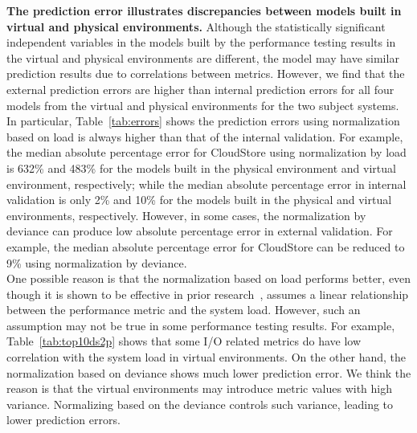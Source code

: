 \documentclass[smallextended]{svjour3}       %
\begin{document}
\noindent \textbf{The prediction error illustrates discrepancies between models built in virtual and physical environments.} Although the statistically significant independent variables in the models built by the performance testing results in the virtual and physical environments are different, the model may have similar prediction results due to correlations between metrics. However, we find that the external prediction errors are higher than internal prediction errors for all four models from the virtual and physical environments for the two subject systems. In particular, Table~\ref{tab:errors} shows the prediction errors using normalization based on load is always higher than that of the internal validation. For example, the median absolute percentage error for CloudStore using normalization by load is 632\% and 483\% for the models built in the physical environment and virtual environment, respectively; while the median absolute percentage error in internal validation is only 2\% and 10\% for the models built in the physical and virtual environments, respectively. However, in some cases, the normalization by deviance can produce low absolute percentage error in external validation. For example, the median absolute percentage error for CloudStore can be reduced to 9\% using normalization by deviance.\\ 
\indent One possible reason is that the normalization based on load performs better, even though it is shown to be effective in prior research~\cite{Nguyen:2012:ADP:2188286.2188344}, assumes a linear relationship between the performance metric and the system load. However, such an assumption may not be true in some performance testing results. For example, Table~\ref{tab:top10ds2p} shows that some I/O related metrics do have low correlation with the system load in virtual environments. On the other hand, the normalization based on deviance shows much lower prediction error. We think the reason is that the virtual environments may introduce metric values with high variance. Normalizing based on the deviance controls such variance, leading to lower prediction errors.
\end{document}
